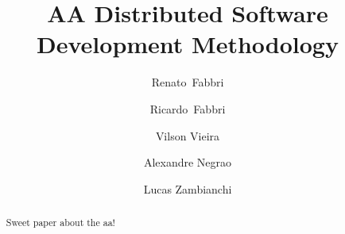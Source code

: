 \title{%
AA Distributed Software Development Methodology
}

\author{%
Renato~Fabbri \and Ricardo~Fabbri \and Vilson Vieira \and Alexandre Negrao \and Lucas Zambianchi
}

\maketitle


\begin{abstract}
Sweet paper about the aa!
\end{abstract}

